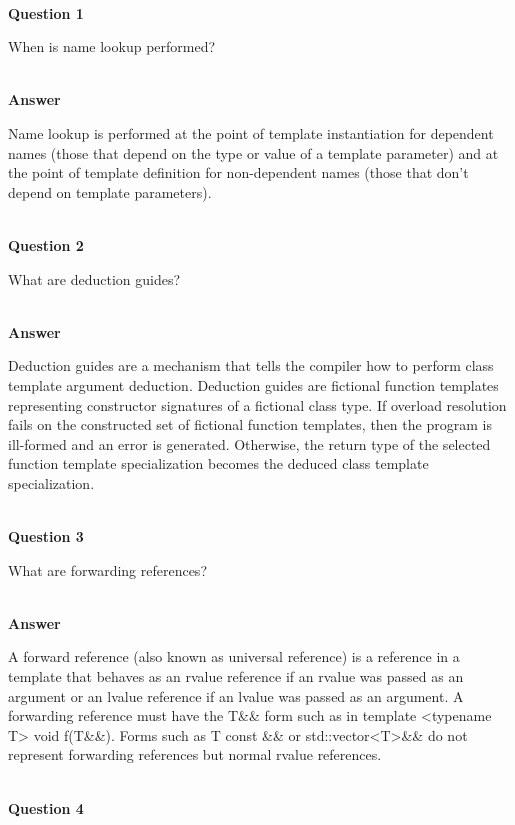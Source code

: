 \hspace*{\fill} \\ %
\noindent
\textbf{Question 1}

When is name lookup performed?

\hspace*{\fill} \\ %
\noindent
\textbf{Answer}

Name lookup is performed at the point of template instantiation for dependent names (those that depend on the type or value of a template parameter) and at the point of template definition for non-dependent names (those that don’t depend on template parameters).


\hspace*{\fill} \\ %
\noindent
\textbf{Question 2}

What are deduction guides?

\hspace*{\fill} \\ %
\noindent
\textbf{Answer}

Deduction guides are a mechanism that tells the compiler how to perform class template argument deduction. Deduction guides are fictional function templates representing constructor signatures of a fictional class type. If overload resolution fails on the constructed set of fictional function templates, then the program is ill-formed and an error is generated. Otherwise, the return type of the selected function template specialization becomes the deduced class template specialization.

\hspace*{\fill} \\ %
\noindent
\textbf{Question 3}

What are forwarding references?

\hspace*{\fill} \\ %
\noindent
\textbf{Answer}

A forward reference (also known as universal reference) is a reference in a template that behaves as an rvalue reference if an rvalue was passed as an argument or an lvalue reference if an lvalue was passed as an argument. A forwarding reference must have the T\&\& form such as in template <typename T> void f(T\&\&). Forms such as T const \&\& or std::vector<T>\&\& do not represent forwarding references but normal rvalue references.

\hspace*{\fill} \\ %
\noindent
\textbf{Question 4}

